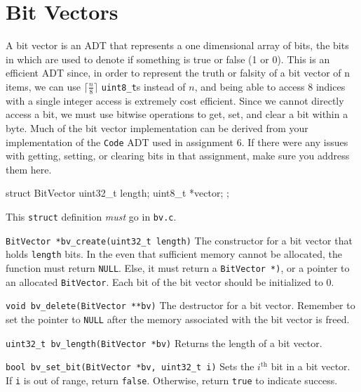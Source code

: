 \section{Bit Vectors}\label{bitvector}

\noindent A bit vector is an ADT that represents a one dimensional array
of bits, the bits in which are used to denote if something is true or
false (1 or 0). This is an efficient ADT since, in order to represent
the truth or falsity of a bit vector of n items, we can use $\lceil
\frac{n}{8} \rceil$ \texttt{uint8\_t}s instead of $n$, and being able to
access 8 indices with a single integer access is extremely cost
efficient. Since we cannot directly access a bit, we must use bitwise
operations to get, set, and clear a bit within a byte. Much of the bit
vector implementation can be derived from your implementation of the
\texttt{Code} ADT used in assignment 6. If there were any issues with
getting, setting, or clearing bits in that assignment, make sure you
address them here.

\begin{clisting}{}
struct BitVector {
  uint32_t length;
  uint8_t *vector;
};
\end{clisting}

This \texttt{struct} definition \emph{must} go in \texttt{bv.c}.

\begin{funcdoc}{\texttt{BitVector *bv\_create(uint32\_t length)}}
  The constructor for a bit vector that holds \texttt{length} bits. In
  the even that sufficient memory cannot be allocated, the function must
  return \texttt{NULL}. Else, it must return a \texttt{BitVector *)}, or
  a pointer to an allocated \texttt{BitVector}. Each bit of the bit
  vector should be initialized to 0.
\end{funcdoc}

\begin{funcdoc}{\texttt{void bv\_delete(BitVector **bv)}}
  The destructor for a bit vector. Remember to set the pointer to
  \texttt{NULL} after the memory associated with the bit vector is
  freed.
\end{funcdoc}

\begin{funcdoc}{\texttt{uint32\_t bv\_length(BitVector *bv)}}
  Returns the length of a bit vector.
\end{funcdoc}

\begin{funcdoc}{\texttt{bool bv\_set\_bit(BitVector *bv, uint32\_t i)}}
  Sets the $i^\text{th}$ bit in a bit vector. If \texttt{i} is out of
  range, return \texttt{false}. Otherwise, return \texttt{true} to
  indicate success.
\end{funcdoc}

